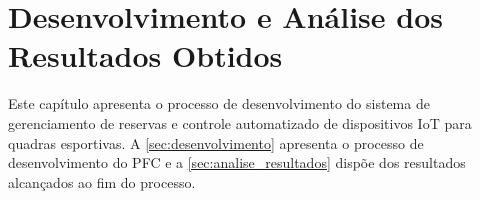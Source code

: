 \chapter{Desenvolvimento e Análise dos Resultados Obtidos}\label{cap:desenvolvimento_e_analise_resultados}
Este capítulo apresenta o processo de desenvolvimento do sistema de gerenciamento de reservas e controle automatizado de dispositivos IoT para quadras esportivas. A \autoref{sec:desenvolvimento} apresenta o processo de desenvolvimento do PFC e a \autoref{sec:analise_resultados} dispõe dos resultados alcançados ao fim do processo.





